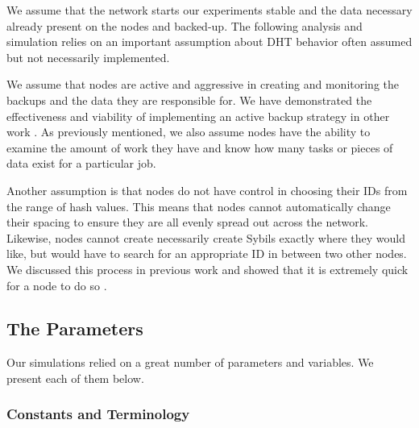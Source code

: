 We assume that the network starts our experiments stable and the data necessary already present on the nodes and backed-up.
The following analysis and simulation relies on an important assumption about DHT behavior often assumed but not necessarily implemented.


We assume that nodes are active and aggressive in creating and monitoring the backups and the data they are responsible for.
We have demonstrated the effectiveness and viability of implementing an active backup strategy in other work \cite{chordreduce} \cite{urdht}.
As previously mentioned, we also assume nodes have the ability to examine the amount of work they have and know how many tasks or pieces of data exist for a particular job.

Another assumption is that nodes do not have control in choosing their IDs from the range of hash values.
This means that nodes cannot automatically change their spacing to ensure they are all evenly spread out across the network.
Likewise, nodes cannot create necessarily create Sybils exactly where they would like, but would have to search for an appropriate ID in between two other nodes.
We discussed this process in previous work and showed that it is extremely quick for a node to do so \cite{sybil-analysis}.





%
%
%


\subsection{The Parameters}

Our simulations relied on a great number of parameters and variables.
We present each of them below.

\subsubsection{Constants and Terminology}

